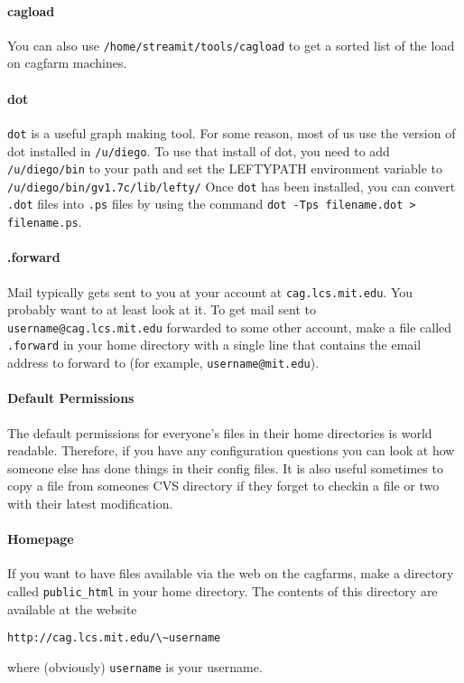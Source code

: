 \paragraph{cagload}

You can also use {\tt /home/streamit/tools/cagload} to get a sorted
list of the load on cagfarm machines.

\paragraph{dot}
\label{sec:dot}
{\tt dot} is a useful graph making tool. For some reason, most of us use
the version of dot installed in {\tt /u/diego}. To use that install
of dot, you need to add {\tt /u/diego/bin} to your path and set
the LEFTYPATH environment variable to {\tt /u/diego/bin/gv1.7c/lib/lefty/}
Once {\tt dot}
has been installed, you can convert {\tt .dot} files into {\tt .ps}
files by using the command {\tt dot -Tps filename.dot > filename.ps}.

\paragraph{.forward}
Mail typically gets sent to you at your account at {\tt cag.lcs.mit.edu}. 
You probably want to
at least look at it. To get mail sent to {\tt username@cag.lcs.mit.edu}
forwarded to some other account, make a file called {\tt .forward}
in your home directory with a single line that contains the email address
to forward to (for example, {\tt username@mit.edu}).

\paragraph{Default Permissions}
The default permissions for everyone's files in their home directories
is world readable. Therefore, if you have any configuration questions 
you can look at how someone else has done things in their config files.
It is also useful sometimes to copy a file from someones
CVS directory if they forget to checkin a file or two with their
latest modification.

\paragraph{Homepage}
If you want to have files available via the web on the cagfarms, make
a directory called {\tt public\_html} in your home directory. The contents
of this directory are available at the website \\
\begin{verbatim}
http://cag.lcs.mit.edu/\~username
\end{verbatim}
 where (obviously) {\tt username} is your username.

